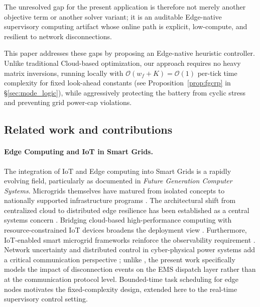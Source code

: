 \documentclass[preprint,12pt]{elsarticle}
\begin{document}
The unresolved gap for the present application is therefore not merely another objective term or another solver variant; it is an auditable Edge-native supervisory computing artifact whose online path is explicit, low-compute, and resilient to network disconnections.

This paper addresses these gaps by proposing an Edge-native heuristic controller. Unlike traditional Cloud-based optimization, our approach requires no heavy matrix inversions, running locally with $\mathcal{O}(w_f{+}K)=\mathcal{O}(1)$ per-tick time complexity for fixed look-ahead constants (see Proposition~\ref{prop:fgcrp} in \S\ref{sec:mode_logic}), while aggressively protecting the battery from cyclic stress and preventing grid power-cap violations.

\subsection{Related work and contributions}
\label{sec:related}
\paragraph*{Edge Computing and IoT in Smart Grids.}
The integration of IoT and Edge computing into Smart Grids is a rapidly evolving field, particularly as documented in \emph{Future Generation Computer Systems}. Microgrids themselves have matured from isolated concepts \cite{lasseter2002microgrids,ton2012us} to nationally supported infrastructure programs \cite{parhizi2015state}. The architectural shift from centralized cloud to distributed edge resilience has been established as a central systems concern \cite{taufer2023edge}. Bridging cloud-based high-performance computing with resource-constrained IoT devices broadens the deployment view \cite{taufer2021cloud}. Furthermore, IoT-enabled smart microgrid frameworks reinforce the observability requirement \cite{wang2024fgcs}. Network uncertainty and distributed control in cyber-physical power systems add a critical communication perspective \cite{chen2023fgcs}; unlike \cite{chen2023fgcs}, the present work specifically models the impact of disconnection events on the EMS dispatch layer rather than at the communication protocol level. Bounded-time task scheduling for edge nodes \cite{liu2025fgcs} motivates the fixed-complexity design, extended here to the real-time supervisory control setting.
\end{document}
